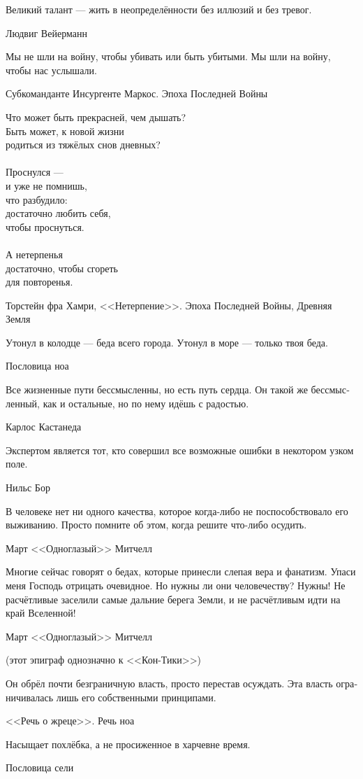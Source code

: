 \documentclass[a4paper,12pt,fleqn]{book}\usepackage{cooltooltips}\usepackage{polyglossia}\setdefaultlanguage[babelshorthands=true]{russian}\setotherlanguage{english}\defaultfontfeatures{Ligatures=TeX,Mapping=tex-text} \usepackage{xcolor}\definecolor{lightgray}{HTML}{bbbbbb}\color{lightgray}\newcommand{\ml}[3]{\textenglish{\textcolor{black}{#3}}}
\begin{document}
{\epigraph
{Великий талант --- жить в неопределённости без иллюзий и без тревог.}
{Людвиг Вейерманн}

\epigraph
{Мы не шли на войну, чтобы убивать или быть убитыми.
Мы шли на войну, чтобы нас услышали.}
{Субкоманданте Инсургенте Маркос.
Эпоха Последней Войны}

\epigraph
{Что может быть прекрасней, чем дышать?\\
Быть может, к новой жизни\\
родиться из тяжёлых снов дневных?\\
~\\
Проснулся ---\\
и уже не помнишь,\\
что разбудило:\\
достаточно любить себя,\\
чтобы проснуться.\\
~\\
А нетерпенья\\
достаточно, чтобы сгореть\\
для повторенья.}
{Торстейн фра Хамри, <<Нетерпение>>.
Эпоха Последней Войны, Древняя Земля}

\epigraph
{Утонул в колодце --- беда всего города.
Утонул в море --- только твоя беда.}
{Пословица ноа}

\epigraph
{Все жизненные пути бессмысленны, но есть путь сердца.
Он такой же бессмысленный, как и остальные, но по нему идёшь с радостью.}
{Карлос Кастанеда}

\epigraph
{Экспертом является тот, кто совершил все возможные ошибки в некотором узком поле.}
{Нильс Бор}

\epigraph
{В человеке нет ни одного качества, которое когда-либо не поспособствовало его выживанию.
Просто помните об этом, когда решите что-либо осудить.}
{Март <<Одноглазый>> Митчелл}

\epigraph
{Многие сейчас говорят о бедах, которые принесли слепая вера и фанатизм.
Упаси меня Господь отрицать очевидное.
Но нужны ли они человечеству?
Нужны!
Не расчётливые заселили самые дальние берега Земли, и не расчётливым идти на край Вселенной!}
{Март <<Одноглазый>> Митчелл}

(этот эпиграф однозначно к <<Кон-Тики>>)

\epigraph
{Он обрёл почти безграничную власть, просто перестав осуждать.
Эта власть ограничивалась лишь его собственными принципами.}
{<<Речь о жреце>>.
Речь ноа}

\epigraph
{Насыщает похлёбка, а не просиженное в харчевне время.}
{Пословица сели}

}
\end{document}

